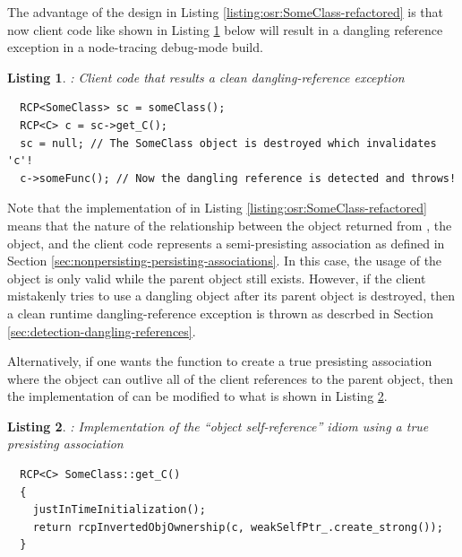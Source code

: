 \documentclass[pdf,ps2pdf,11pt]{SANDreport}
\newtheorem{listing}{Listing}
\begin{document}
The advantage of the design in Listing
{}\ref{listing:osr:SomeClass-refactored} is that now client code like
shown in Listing {}\ref{listing:osr:dangling-ref-SomeClass} below will
result in a dangling reference exception in a node-tracing debug-mode
build.


\begin{listing}: Client code that results a clean dangling-reference exception  \\
\label{listing:osr:dangling-ref-SomeClass}
{\small\begin{verbatim}
  RCP<SomeClass> sc = someClass();
  RCP<C> c = sc->get_C();
  sc = null; // The SomeClass object is destroyed which invalidates 'c'!
  c->someFunc(); // Now the dangling reference is detected and throws!
\end{verbatim}}
\end{listing}


Note that the implementation of {} in Listing
{}\ref{listing:osr:SomeClass-refactored} means that the nature of the
relationship between the {} object returned from
{}, the {} object, and the
client code represents a semi-presisting association as defined in
Section {}\ref{sec:nonpersisting-persisting-associations}.  In this
case, the usage of the {} object is only valid while the parent
{} object still exists.  However, if the client
mistakenly tries to use a dangling {} object after its parent
{} object is destroyed, then a clean runtime
dangling-reference exception is thrown as descrbed in Section
{}\ref{sec:detection-dangling-references}.

Alternatively, if one wants the {} function
to create a true presisting association where the {} object can
outlive all of the client references to the parent {}
object, then the implementation of {} can be
modified to what is shown in Listing
{}\ref{listing:osr:SomeClass-get_C-persisting}.


\begin{listing}:  Implementation of the ``object self-reference'' idiom
using a true presisting association  \\
\label{listing:osr:SomeClass-get_C-persisting}
{\small\begin{verbatim}
  RCP<C> SomeClass::get_C()
  {
    justInTimeInitialization();
    return rcpInvertedObjOwnership(c, weakSelfPtr_.create_strong());
  }
\end{verbatim}}
\end{listing}
\end{document}
